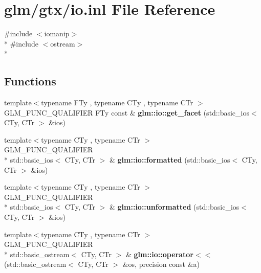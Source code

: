\hypertarget{io_8inl}{\section{glm/gtx/io.inl File Reference}
\label{io_8inl}
}
{\ttfamily \#include $<$iomanip$>$}\\*
{\ttfamily \#include $<$ostream$>$}\\*
\subsection*{Functions}
\begin{DoxyCompactItemize}
\item 
\hypertarget{namespaceglm_1_1io_a9e8927cf032254b0eee4ec650286e1f9}{{\footnotesize template$<$typename F\-Ty , typename C\-Ty , typename C\-Tr $>$ }\\G\-L\-M\-\_\-\-F\-U\-N\-C\-\_\-\-Q\-U\-A\-L\-I\-F\-I\-E\-R F\-Ty const \& {\bfseries glm\-::io\-::get\-\_\-facet} (std\-::basic\-\_\-ios$<$ C\-Ty, C\-Tr $>$ \&ios)}\label{namespaceglm_1_1io_a9e8927cf032254b0eee4ec650286e1f9}

\item 
\hypertarget{namespaceglm_1_1io_a61bbd0ea648623b0b07215a986bd5aa5}{{\footnotesize template$<$typename C\-Ty , typename C\-Tr $>$ }\\G\-L\-M\-\_\-\-F\-U\-N\-C\-\_\-\-Q\-U\-A\-L\-I\-F\-I\-E\-R \\*
std\-::basic\-\_\-ios$<$ C\-Ty, C\-Tr $>$ \& {\bfseries glm\-::io\-::formatted} (std\-::basic\-\_\-ios$<$ C\-Ty, C\-Tr $>$ \&ios)}\label{namespaceglm_1_1io_a61bbd0ea648623b0b07215a986bd5aa5}

\item 
\hypertarget{namespaceglm_1_1io_a833a8c96b3d84f7aa76e0c3e6845503e}{{\footnotesize template$<$typename C\-Ty , typename C\-Tr $>$ }\\G\-L\-M\-\_\-\-F\-U\-N\-C\-\_\-\-Q\-U\-A\-L\-I\-F\-I\-E\-R \\*
std\-::basic\-\_\-ios$<$ C\-Ty, C\-Tr $>$ \& {\bfseries glm\-::io\-::unformatted} (std\-::basic\-\_\-ios$<$ C\-Ty, C\-Tr $>$ \&ios)}\label{namespaceglm_1_1io_a833a8c96b3d84f7aa76e0c3e6845503e}

\item 
\hypertarget{namespaceglm_1_1io_ac52a8c5f8ea189f5bae2e5b8e382675f}{{\footnotesize template$<$typename C\-Ty , typename C\-Tr $>$ }\\G\-L\-M\-\_\-\-F\-U\-N\-C\-\_\-\-Q\-U\-A\-L\-I\-F\-I\-E\-R \\*
std\-::basic\-\_\-ostream$<$ C\-Ty, C\-Tr $>$ \& {\bfseries glm\-::io\-::operator$<$$<$} (std\-::basic\-\_\-ostream$<$ C\-Ty, C\-Tr $>$ \&os, precision const \&a)}\label{namespaceglm_1_1io_ac52a8c5f8ea189f5bae2e5b8e382675f}


\end{DoxyCompactItemize}
